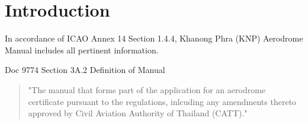 \chapter{Introduction}

In accordance of ICAO Annex 14 Section 1.4.4, Khanong Phra (KNP) Aerodrome Manual includes all pertinent information.

Doc 9774 Section 3A.2
Definition of Manual
\begin{quote}
"The manual that forms part of the application for an aerodrome certificate pursuant to the regulations, inlcuding any amendments thereto approved by Civil Aviation Authority of Thailand (CATT)."
\end{quote}